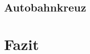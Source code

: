 \documentclass[11pt, a4paper]{article}
\newcommand\myref[1]{\ref{#1} (S. \pageref{#1})}
\newcommand\myrefcomma[1]{\ref{#1}, S. \pageref{#1}}
\begin{document}
\subsection{Autobahnkreuz}

\newpage
\section{Fazit}
\label{sec:fazit}

\blindtext
\blindtext
\blindtext


{}

\end{document}

